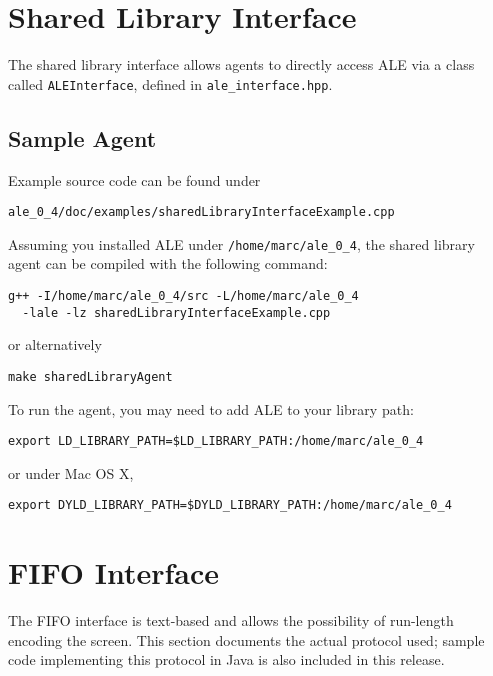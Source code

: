 \documentclass[12pt]{article}
\begin{document}
\section{Shared Library Interface}\label{sec:shared_library_interface}

The shared library interface allows agents to directly access ALE via a class called
\verb+ALEInterface+, defined in \verb+ale_interface.hpp+. 

\subsection{Sample Agent}

Example source code can be found under

\begin{verbatim}
ale_0_4/doc/examples/sharedLibraryInterfaceExample.cpp
\end{verbatim}

Assuming you installed ALE under \verb+/home/marc/ale_0_4+, the shared library agent can be 
compiled with the following command: 

\begin{verbatim}
g++ -I/home/marc/ale_0_4/src -L/home/marc/ale_0_4 
  -lale -lz sharedLibraryInterfaceExample.cpp 
\end{verbatim}

or alternatively

\begin{verbatim}
make sharedLibraryAgent
\end{verbatim}

To run the agent, you may need to add ALE to your library path:

\begin{verbatim}
export LD_LIBRARY_PATH=$LD_LIBRARY_PATH:/home/marc/ale_0_4
\end{verbatim}

or under Mac OS X,

\begin{verbatim}
export DYLD_LIBRARY_PATH=$DYLD_LIBRARY_PATH:/home/marc/ale_0_4
\end{verbatim}

\section{FIFO Interface}\label{sec:pipes_interface}

The FIFO interface is text-based and allows the possibility of run-length encoding the screen. This section documents the actual protocol used; sample code implementing this protocol in Java is also included in this release.
\end{document}

